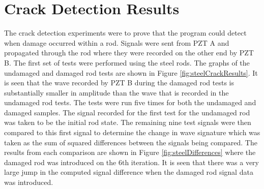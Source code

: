\section{Crack Detection Results}
The crack detection experiments were to prove that the program could detect when damage occurred within a rod. Signals were sent from PZT A and propagated through the rod where they were recorded on the other end by PZT B. The first set of tests were performed using the steel rods. The graphs of the undamaged and damaged rod tests are shown in Figure \ref{fig:steelCrackResults}. It is seen that the wave recorded by PZT B during the damaged rod tests is substantially smaller in amplitude than the wave that is recorded in the undamaged rod tests. The tests were run five times for both the undamaged and damaged samples. The signal recorded for the first test for the undamaged rod was taken to be the initial rod state. The remaining nine test signals were then compared to this first signal to determine the change in wave signature which was taken as the sum of squared differences between the signals being compared. The results from each comparison are shown in Figure \ref{fig:steelDifferences} where the damaged rod was introduced on the 6th iteration. It is seen that there was a very large jump in the computed signal difference when the damaged rod signal data was introduced. 

